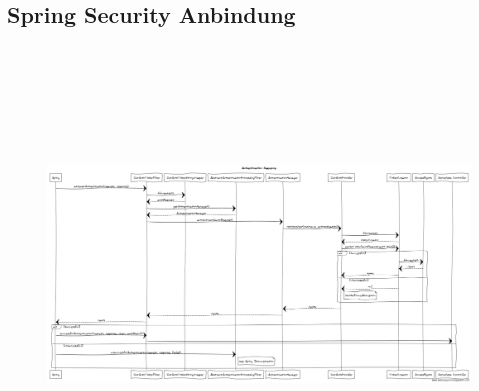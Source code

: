 \documentclass[a4paper,20pt,oneside]{book}
\begin{document}
	\subsection{Spring Security Anbindung}	
	\begin{figure}[!hb]
    \includegraphics[width=18cm,height=12cm]{auth}
	\end{figure}
	\newpage
\end{document}
